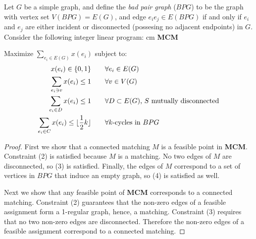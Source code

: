 



Let $G$ be a simple graph, and define the \textit{bad pair graph} ($BPG$) to be the graph with vertex set $V(BPG) = E(G)$, and edge $e_ie_j \in E(BPG)$ if and only if $e_i$ and $e_j$ are either incident or disconnected (possesing no adjacent endpoints) in $G$.  Consider the following integer linear program:
 cm
\noindent\textbf{MCM}

\noindent Maximize $\displaystyle \sum_{e_i \in E(G)} x(e_i)$ subject to: 
\begin{align}
	x(e_i) \in \{0,1\} \qquad &\forall e_i \in E(G)\\
	\sum_{e_i \ni v} x(e_i) \leq 1 \qquad &\forall v\in V(G)\\
	\sum_{e_i \in D} x(e_i) \leq 1 \qquad &\forall D\subset E(G)\makebox{, $S$ mutually disconnected}\\
	\sum_{e_i \in C} x(e_i) \leq \lfloor \frac{1}{2}k\rfloor \qquad& \forall \makebox{$k$-cycles in $BPG$}
\end{align} 

\begin{proof}
	First we show that a connected matching $M$ is a feasible point in \textbf{MCM}.  Constraint (2) is satisfied because $M$ is a matching.  No two edges of $M$ are disconnected, so (3) is satisfied.  Finally, the edges of $M$ correspond to a set of vertices in $BPG$ that induce an empty graph, so (4) is satisfied as well.

Next we show that any feasible point of \textbf{MCM} corresponds to a connected matching.  Constraint (2) guarantees that the non-zero edges of a feasible assignment form a 1-regular graph, hence, a matching.  Constraint (3) requires that no two non-zero edges are disconnected.  Therefore the non-zero edges of a feasible assignment correspond to a connected matching.    
\end{proof}

